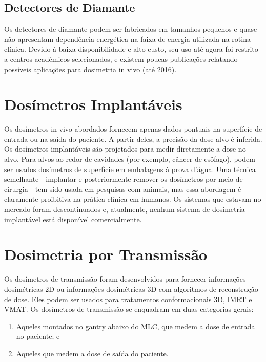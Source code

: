 \documentclass[11pt,a4paper]{article}
\newcounter{exemplo}
\begin{document}
\subsection*{Detectores de Diamante}

	Os detectores de diamante podem ser fabricados em tamanhos pequenos e quase não apresentam dependência energética na faixa de energia utilizada na rotina clínica. Devido à baixa disponibilidade e alto custo, seu uso até agora foi restrito a centros acadêmicos selecionados, e existem poucas publicações relatando possíveis aplicações para dosimetria in vivo (até 2016).

\section*{Dosímetros Implantáveis}

	Os dosímetros in vivo abordados fornecem apenas dados pontuais na superfície de entrada ou  na saída do paciente. A partir deles, a precisão da dose alvo é inferida. Os dosímetros implantáveis são projetados para medir diretamente a dose no alvo. Para alvos ao redor de cavidades (por exemplo, câncer de esôfago), podem ser usados dosímetros de superfície em embalagens à prova d'água. Uma técnica semelhante - implantar e posteriormente remover os dosímetros por meio de cirurgia - tem sido usada em pesquisas com animais, mas essa abordagem é claramente proibitiva na prática clínica em humanos. Os sistemas que estavam no mercado foram descontinuados e, atualmente, nenhum sistema de dosimetria implantável está disponível comercialmente.

\section*{Dosimetria por Transmissão}

	Os dosímetros de transmissão foram desenvolvidos para fornecer informações dosimétricas 2D ou informações dosimétricas 3D com algoritmos de reconstrução de dose. Eles podem ser usados para tratamentos conformacionais 3D, IMRT e VMAT. Os dosímetros de transmissão se enquadram em duas categorias gerais:
	
	\begin{enumerate}
		\item Aqueles montados no gantry abaixo do MLC, que medem a dose de entrada no paciente; e
		\item Aqueles que medem a dose de saída do paciente.
	\end{enumerate} 
\end{document}
